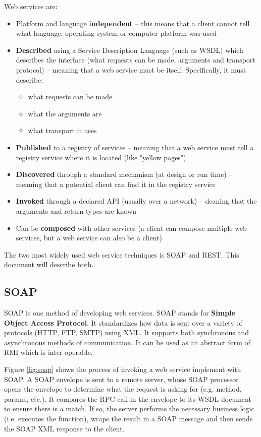 \documentclass{article}
\begin{document}
Web services are:
\begin{itemize}
    \item Platform and language \textbf{independent} -- this means that a client cannot tell what language, operating system  or computer platform was used
    \item \textbf{Described} using a Service Description Language (such as WSDL) which describes the interface (what requests can be made, arguments and transport protocol) -- meaning that a web service must be itself. Specifically, it must describe:
    \begin{itemize}
    	\item what requests can be made
    	\item what the arguments are
    	\item what transport it uses
    \end{itemize}
    \item \textbf{Published} to a registry of services -- meaning that a web service must tell a registry service where it is located (like "yellow pages")
    \item \textbf{Discovered} through a standard mechanism (at design or run time) -- meaning that a potential client can find it in the registry service
    \item \textbf{Invoked} through a declared API (usually over a network) -- deaning that the arguments and return types are known
    \item Can be \textbf{composed} with other services (a client can compose multiple web services, but a web service can also be a client)
\end{itemize}

The two most widely used web service techniques is SOAP and REST. This document will describe both.

\subsection{SOAP}

SOAP is one method of developing web services. SOAP stands for \textbf{Simple Object Access Protocol}. It standardizes how data is sent over a variety of protocols (HTTP, FTP, SMTP) using XML. It supports both synchronous and asynchronous methods of communication. It can be used as an abstract form of RMI which is inter-operable. 

Figure \ref{fig:soap} shows the process of invoking a web service implement with SOAP. A SOAP envelope is sent to a remote server, whose SOAP processor opens the envelope to determine what the request is asking for (e.g. method, params, etc.). It compares the RPC call in the envelope to its WSDL document to ensure there is a match. If so, the server performs the necessary business logic (i.e. executes the function), wraps the result in a SOAP message and then sends the SOAP XML response to the client.
\end{document}
